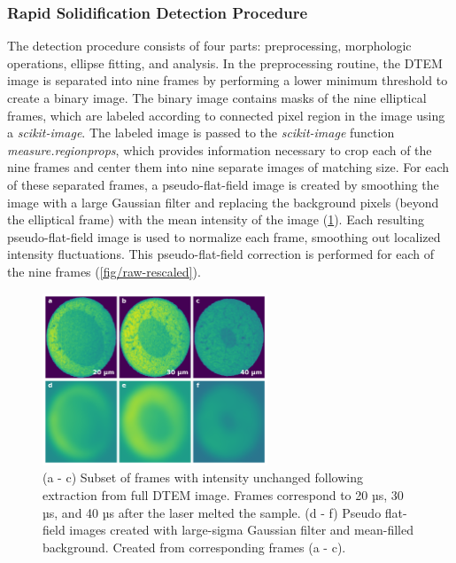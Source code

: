 \subsubsection{Rapid Solidification Detection Procedure}
The detection procedure consists of four parts:
preprocessing, morphologic operations, ellipse fitting, and analysis. In
the preprocessing routine, the DTEM image is separated into nine frames by
performing a lower minimum threshold to create a binary image. The binary
image contains masks of the nine elliptical frames, which are labeled
according to connected pixel region in the image using a \textit{scikit-image}.
The labeled image is passed to the \textit{scikit-image} function
\textit{measure.regionprops}, which provides information necessary to crop
each of the nine frames and center them into nine separate images of matching
size. For each of
these separated frames, a pseudo-flat-field image is created by smoothing
the image with a large Gaussian filter and replacing the background pixels
(beyond the elliptical frame) with the mean intensity of the image
(\ref{fig/raw-flatfield}). Each resulting pseudo-flat-field image is
used to normalize each frame, smoothing out localized intensity fluctuations.
This pseudo-flat-field correction is performed for each of the nine frames
(\ref{fig/raw-rescaled}).

\begin{figure}[ht]
    \centering
    \includegraphics[width=0.6\textwidth]{figures/04/05-raw-flatfield.png}
    \caption{
        \small{}
        (a - c) Subset of frames with intensity unchanged following
        extraction from full DTEM image. Frames correspond to 20 µs, 30 µs,
        and 40 µs after the laser melted the sample.
        (d - f) Pseudo flat-field images created with large-sigma Gaussian
        filter and mean-filled background.
        Created from corresponding frames (a - c).
    }
    \label{fig/raw-flatfield}
\end{figure}

